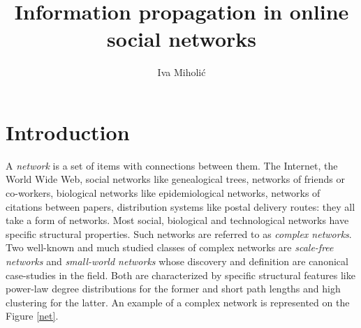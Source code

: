 \documentclass[times, utf8, zavrsni]{fer}
\begin{document}

\title{Information propagation in online social networks}

\author{Iva Miholić}

\maketitle

\izvornik{}

\tableofcontents
\clearpage
\listoffigures
\listoftables

\chapter{Introduction}

A \emph{network} is a set of items with connections between them. The Internet, the World Wide Web, social networks like genealogical trees, networks of friends or co-workers, biological networks like epidemiological networks, networks of citations between papers, distribution systems like postal delivery routes: they all take a form of networks. Most social, biological and technological networks have specific structural properties. Such networks are referred to as \emph{complex networks}. Two well-known and much studied classes of complex networks are \emph{scale-free networks} and \emph{small-world networks} whose discovery and definition are canonical case-studies in the field. Both are characterized by specific structural features like power-law degree distributions for the former and short path lengths and high clustering for the latter. An example of a complex network is represented on the Figure \ref{net}.
\end{document}
